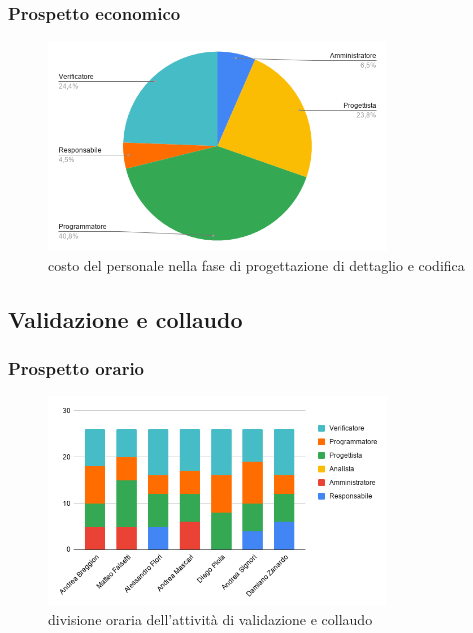     \subsubsection{Prospetto economico}
    \def\salarycontent{
        {Amministratore,22,20,440},
        {Analista,0,25,0},
        {Progettista,80,22,1760},
        {Programmatore,137,15,2055},
        {Responsabile,15,30,450},
        {Verificatore,82,15,1230},
        {Totale,336,127,5935},
    }
    
    \begin{figure}[H]
        \centering
        \includegraphics[width=0.8\textwidth]{source/img/codifica_ruoli.png}
        \caption{costo del personale nella fase di progettazione di dettaglio e codifica}
    \end{figure}
\subsection{Validazione e collaudo}
    \subsubsection{Prospetto orario}
    \def\hourlycontent{
        {Andrea Breggion,0,5,0,5,8,8,26},
        {Matteo Falsetti,0,5,0,10,5,6,26},
        {Alessandro Flori,5,0,0,7,4,10,26},
        {Andrea Mascari,0,6,0,6,5,9,26},
        {Diego Piola,0,0,0,8,8,10,26},
        {Andrea Signori,4,0,0,6,9,7,26},
        {Damiano Zanardo,6,0,0,6,4,10,26},
        {Ore totali,15,16,0,48,43,60,182},
    }
    
    \begin{figure}[H]
        \centering
        \includegraphics[width=0.8\textwidth]{source/img/validazione_orari.png}
        \caption{divisione oraria dell'attività di validazione e collaudo}
    \end{figure}
